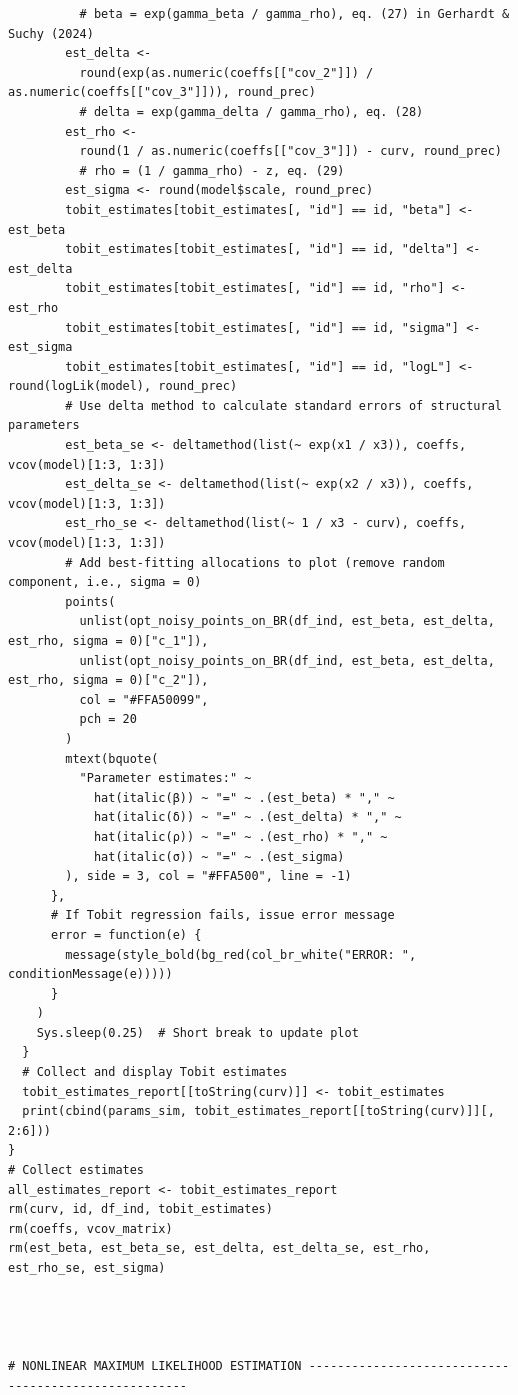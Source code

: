 \begin{lstlisting}
          # beta = exp(gamma_beta / gamma_rho), eq. (27) in Gerhardt & Suchy (2024)
        est_delta <-
          round(exp(as.numeric(coeffs[["cov_2"]]) / as.numeric(coeffs[["cov_3"]])), round_prec)
          # delta = exp(gamma_delta / gamma_rho), eq. (28)
        est_rho <-
          round(1 / as.numeric(coeffs[["cov_3"]]) - curv, round_prec)
          # rho = (1 / gamma_rho) - z, eq. (29)
        est_sigma <- round(model$scale, round_prec)
        tobit_estimates[tobit_estimates[, "id"] == id, "beta"] <- est_beta
        tobit_estimates[tobit_estimates[, "id"] == id, "delta"] <- est_delta
        tobit_estimates[tobit_estimates[, "id"] == id, "rho"] <- est_rho
        tobit_estimates[tobit_estimates[, "id"] == id, "sigma"] <- est_sigma
        tobit_estimates[tobit_estimates[, "id"] == id, "logL"] <- round(logLik(model), round_prec)
        # Use delta method to calculate standard errors of structural parameters
        est_beta_se <- deltamethod(list(~ exp(x1 / x3)), coeffs, vcov(model)[1:3, 1:3])
        est_delta_se <- deltamethod(list(~ exp(x2 / x3)), coeffs, vcov(model)[1:3, 1:3])
        est_rho_se <- deltamethod(list(~ 1 / x3 - curv), coeffs, vcov(model)[1:3, 1:3])
        # Add best-fitting allocations to plot (remove random component, i.e., sigma = 0)
        points(
          unlist(opt_noisy_points_on_BR(df_ind, est_beta, est_delta, est_rho, sigma = 0)["c_1"]),
          unlist(opt_noisy_points_on_BR(df_ind, est_beta, est_delta, est_rho, sigma = 0)["c_2"]),
          col = "#FFA50099",
          pch = 20
        )
        mtext(bquote(
          "Parameter estimates:" ~
            hat(italic(β)) ~ "=" ~ .(est_beta) * "," ~
            hat(italic(δ)) ~ "=" ~ .(est_delta) * "," ~
            hat(italic(ρ)) ~ "=" ~ .(est_rho) * "," ~
            hat(italic(σ)) ~ "=" ~ .(est_sigma)
        ), side = 3, col = "#FFA500", line = -1)
      },
      # If Tobit regression fails, issue error message
      error = function(e) {
        message(style_bold(bg_red(col_br_white("ERROR: ", conditionMessage(e)))))
      }
    )
    Sys.sleep(0.25)  # Short break to update plot
  }
  # Collect and display Tobit estimates
  tobit_estimates_report[[toString(curv)]] <- tobit_estimates
  print(cbind(params_sim, tobit_estimates_report[[toString(curv)]][, 2:6]))
}
# Collect estimates
all_estimates_report <- tobit_estimates_report
rm(curv, id, df_ind, tobit_estimates)
rm(coeffs, vcov_matrix)
rm(est_beta, est_beta_se, est_delta, est_delta_se, est_rho, est_rho_se, est_sigma)




# NONLINEAR MAXIMUM LIKELIHOOD ESTIMATION -----------------------------------------------------



\end{lstlisting}

